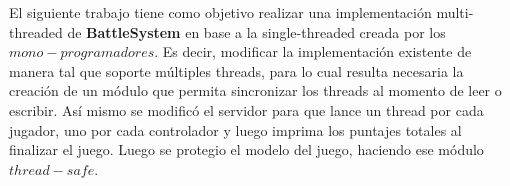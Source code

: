 El siguiente trabajo tiene como objetivo realizar una implementación multi-threaded de \textbf{BattleSystem} en base a la single-threaded creada por los $mono-programadores$. Es decir, modificar la implementación existente de manera tal que soporte múltiples threads, para lo cual resulta necesaria la creación de un módulo que permita sincronizar los threads al momento de leer o escribir. 
Así mismo se modificó el servidor para que lance un thread por cada jugador, uno por cada controlador y luego imprima los puntajes totales al finalizar el juego.
Luego se protegio el modelo del juego, haciendo ese módulo $thread-safe$.

